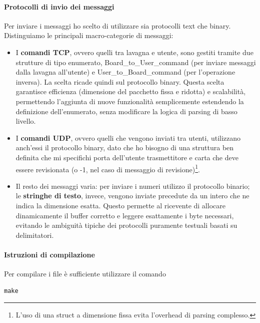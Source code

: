 \documentclass[11pt,a4paper,twocolumn,twoside]{paper}
\begin{document}
\paragraph{Protocolli di invio dei messaggi}
    Per inviare i messaggi ho scelto di utilizzare sia protocolli text che binary. Distinguiamo le principali macro-categorie di messaggi:
    \begin{itemize}
        \item I \textbf{comandi TCP}, ovvero quelli tra lavagna e utente, sono gestiti tramite due strutture di tipo enumerato, Board\_to\_User\_command (per inviare messaggi dalla lavagna all'utente) e User\_to\_Board\_command (per l'operazione inversa). La scelta ricade quindi sul protocollo binary. Questa scelta garantisce efficienza (dimensione del pacchetto fissa e ridotta) e scalabilità, permettendo l'aggiunta di nuove funzionalità semplicemente estendendo la definizione dell'enumerato, senza modificare la logica di parsing di basso livello.
        \item I \textbf{comandi UDP}, ovvero quelli che vengono inviati tra utenti, utilizzano anch'essi il protocollo binary, dato che ho bisogno di una struttura ben definita che mi specifichi porta dell'utente trasmettitore e carta che deve essere revisionata (o -1, nel caso di messaggio di revisione)\footnote{L'uso di una struct a dimensione fissa evita l'overhead di parsing complesso.}.
        \item Il resto dei messaggi varia: per inviare i numeri utilizzo il protocollo binario; le \textbf{stringhe di testo}, invece, vengono inviate precedute da un intero che ne indica la dimensione esatta. Questo permette al ricevente di allocare dinamicamente il buffer corretto e leggere esattamente i byte necessari, evitando le ambiguità tipiche dei protocolli puramente testuali basati su delimitatori. 
    \end{itemize}
\paragraph{Istruzioni di compilazione}
    Per compilare i file è sufficiente utilizzare il comando
    \begin{lstlisting}
make
    \end{lstlisting}
\end{document}
